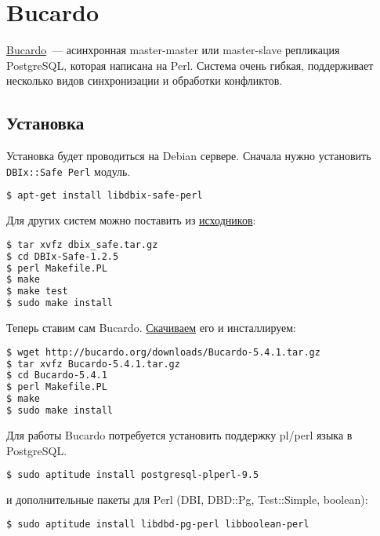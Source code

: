 \section{Bucardo}

\href{https://bucardo.org/wiki/Bucardo}{Bucardo}~--- асинхронная master-master или master-slave репликация PostgreSQL, которая написана на Perl. Система очень гибкая, поддерживает несколько видов синхронизации и обработки конфликтов.

\subsection{Установка}

Установка будет проводиться на Debian сервере. Сначала нужно установить \lstinline!DBIx::Safe Perl! модуль.

\begin{lstlisting}[language=Bash,label=lst:bucardo1,caption=Установка]
$ apt-get install libdbix-safe-perl
\end{lstlisting}

Для других систем можно поставить из \href{http://search.cpan.org/CPAN/authors/id/T/TU/TURNSTEP/}{исходников}:

\begin{lstlisting}[language=Bash,label=lst:bucardo2,caption=Установка]
$ tar xvfz dbix_safe.tar.gz
$ cd DBIx-Safe-1.2.5
$ perl Makefile.PL
$ make
$ make test
$ sudo make install
\end{lstlisting}

Теперь ставим сам Bucardo. \href{http://bucardo.org/wiki/Bucardo#Obtaining_Bucardo}{Скачиваем} его и инсталлируем:

\begin{lstlisting}[language=Bash,label=lst:bucardo3,caption=Установка]
$ wget http://bucardo.org/downloads/Bucardo-5.4.1.tar.gz
$ tar xvfz Bucardo-5.4.1.tar.gz
$ cd Bucardo-5.4.1
$ perl Makefile.PL
$ make
$ sudo make install
\end{lstlisting}

Для работы Bucardo потребуется установить поддержку pl/perl языка в PostgreSQL.

\begin{lstlisting}[language=Bash,label=lst:bucardo4,caption=Установка]
$ sudo aptitude install postgresql-plperl-9.5
\end{lstlisting}

и дополнительные пакеты для Perl (DBI, DBD::Pg, Test::Simple, boolean):

\begin{lstlisting}[language=Bash,label=lst:bucardo-packet1,caption=Установка]
$ sudo aptitude install libdbd-pg-perl libboolean-perl
\end{lstlisting}

